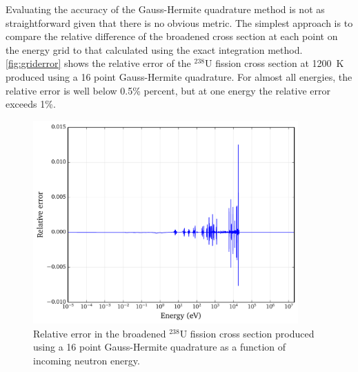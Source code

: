 \documentclass[3p,authoryear]{elsarticle}
\begin{document}
Evaluating the accuracy of the Gauss-Hermite quadrature method is not as
straightforward given that there is no obvious metric. The simplest approach is
to compare the relative difference of the broadened cross section at each point
on the energy grid to that calculated using the exact integration
method. \autoref{fig:griderror} shows the relative error of the $^{238}$U
fission cross section at \SI{1200}{\kelvin} produced using a 16 point
Gauss-Hermite quadrature. For almost all energies, the relative error is well
below 0.5\% percent, but at one energy the relative error exceeds 1\%.
\begin{figure}[H]
  \centering
  \includegraphics[width=4in]{plots/griderror.pdf}
  \caption{Relative error in the broadened $^{238}$U fission cross section
    produced using a 16 point Gauss-Hermite quadrature as a function of incoming
    neutron energy.}
  \label{fig:griderror}
\end{figure}
\end{document}
